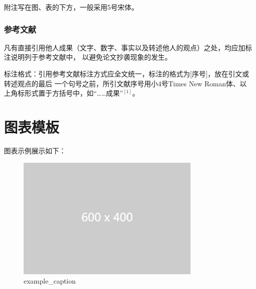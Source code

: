 \documentclass[zihao=-4]{ctexart}
\begin{document}
\begin{spacing}{1.5}
附注写在图、表的下方，一般采用5号宋体。

\subsubsection{参考文献}
凡有直接引用他人成果（文字、数字、事实以及转述他人的观点）之处，均应加标注说明列于参考文献中，
以避免论文抄袭现象的发生。

标注格式：引用参考文献标注方式应全文统一，标注的格式为[序号]，放在引文或转述观点的最后
一个句号之前，所引文献序号用小4号Times New Roman体、以上角标形式置于方括号中，如“……成果”$^{[1]}$。
\section{图表模板}
图表示例展示如下：

\begin{figure}[H] %
    \centering %
    \includegraphics[width=0.8\textwidth]{example-image-2.png} %
    \caption{example\_caption} %
    \label{example_label} %
\end{figure}


\end{spacing}
\end{document}
